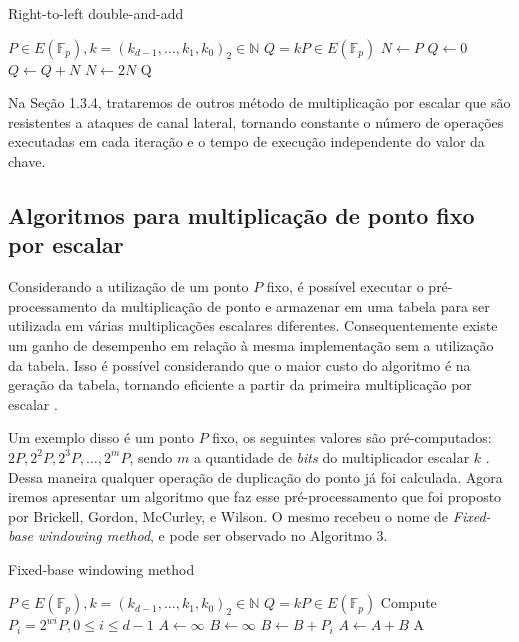 \begin{algorithm}[H]
\caption{Right-to-left double-and-add}
\begin{algorithmic} 
    \REQUIRE $P \in E(\mathbb{F}_p), k=(k_{d-1},\ldots,k_1,k_0)_2 \in \mathbb{N}$
    \ENSURE $Q = kP \in E(\mathbb{F}_p)$
    \STATE $N \leftarrow P$
    \STATE $Q \leftarrow 0$
            \STATE $Q \leftarrow Q + N$
        \ENDIF
        \STATE $N \leftarrow 2N$
    \ENDFOR
    \RETURN Q
    \end{algorithmic}
\end{algorithm}

Na Seção 1.3.4, trataremos de outros método de multiplicação por escalar que são resistentes a ataques de canal lateral, tornando constante o número de operações executadas em cada iteração e o tempo de execução independente do valor da chave.

\subsection{Algoritmos para multiplicação de ponto fixo por escalar}

Considerando a utilização de um ponto $P$ fixo, é possível executar o pré-processamento da multiplicação de ponto e armazenar em uma tabela para ser utilizada em várias multiplicações escalares diferentes. Consequentemente existe um ganho de desempenho em relação à mesma implementação sem a utilização da tabela. Isso é possível considerando que o maior custo do algoritmo é na geração da tabela, tornando eficiente a partir da primeira multiplicação por escalar \cite{Hankerson:2003:GEC:940321}.

Um exemplo disso é um ponto $P$ fixo, os seguintes valores são pré-computados: $2P, 2^2P, 2^3P,\ldots, 2^mP$, sendo $m$ a quantidade de \emph{bits} do multiplicador escalar $k$ \cite{Hankerson:2003:GEC:940321}. Dessa maneira qualquer operação de duplicação do ponto já foi calculada. Agora iremos apresentar um algoritmo que faz esse pré-processamento que foi proposto por Brickell, Gordon, McCurley, e Wilson. O mesmo recebeu o nome de \textit{Fixed-base windowing method}, e pode ser observado no Algoritmo 3.

\renewcommand{\algorithmicforall}{\textbf{for each}}

\begin{algorithm}[H]
\caption{Fixed-base windowing method}
\begin{algorithmic} 
    \REQUIRE $P \in E(\mathbb{F}_p), k=(k_{d-1},\ldots,k_1,k_0)_2 \in \mathbb{N}$
    \ENSURE $Q = kP \in E(\mathbb{F}_p)$
    \STATE Compute $P_i = 2^{wi}P, 0 \le i \le d-1$
    \STATE $A \leftarrow \infty$
    \STATE $B \leftarrow \infty$
            \STATE $B \leftarrow B + P_i$
            \STATE $A \leftarrow A + B$
        \ENDFOR
    \ENDFOR
    \RETURN A
    \end{algorithmic}
\end{algorithm}

